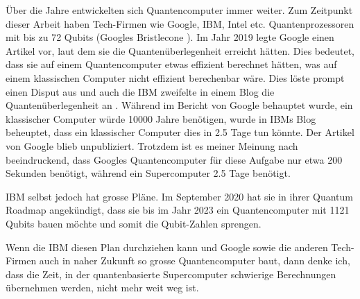 Über die Jahre entwickelten sich Quantencomputer immer weiter. Zum Zeitpunkt dieser Arbeit haben Tech-Firmen wie Google, IBM, Intel etc. Quantenprozessoren mit bis zu 72 Qubits (Googles Bristlecone \cite{gbc}). Im Jahr 2019 legte Google einen Artikel \cite{GSP} vor, laut dem sie die Quantenüberlegenheit erreicht hätten. Dies bedeutet, dass sie auf einem Quantencomputer etwas effizient berechnet hätten, was auf einem klassischen Computer nicht effizient berechenbar wäre. Dies löste prompt einen Disput aus und auch die IBM zweifelte in einem Blog die Quantenüberlegenheit an \cite{IBM}. Während im Bericht von Google behauptet wurde, ein klassischer Computer würde 10000 Jahre benötigen, wurde in IBMs Blog beheuptet, dass ein klassischer Computer dies in 2.5 Tage tun könnte. Der Artikel von Google blieb unpubliziert. Trotzdem ist es meiner Meinung nach beeindruckend, dass Googles Quantencomputer für diese Aufgabe nur etwa 200 Sekunden benötigt, während ein Supercomputer 2.5 Tage benötigt.

IBM selbst jedoch hat grosse Pläne. Im September 2020 hat sie in ihrer Quantum Roadmap \cite{IBMrm} angekündigt, dass sie bis im Jahr 2023 ein Quantencomputer mit 1121 Qubits bauen möchte und somit die Qubit-Zahlen sprengen.

Wenn die IBM diesen Plan durchziehen kann und Google sowie die anderen Tech-Firmen auch in naher Zukunft so grosse Quantencomputer baut, dann denke ich, dass die Zeit, in der quantenbasierte Supercomputer schwierige Berechnungen übernehmen werden, nicht mehr weit weg ist.